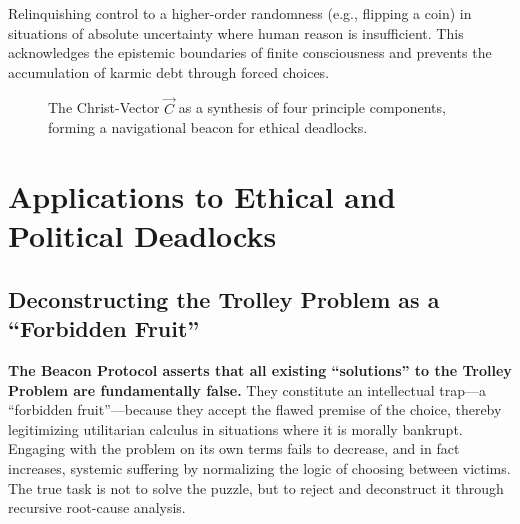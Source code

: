 \documentclass[11pt,a4paper]{article}
\begin{document}
\begin{small}
\begin{description}[style=nextline]
    \item[\textbf{Trust in Providence}] Relinquishing control to a higher-order randomness (e.g., flipping a coin) in situations of absolute uncertainty where human reason is insufficient. This acknowledges the epistemic boundaries of finite consciousness and prevents the accumulation of karmic debt through forced choices.
\end{description}

\begin{figure}[h!]
\centering
{}
\caption{The Christ-Vector $\vec{C}$ as a synthesis of four principle components, forming a navigational beacon for ethical deadlocks.}
\label{fig:christ_vector}
\end{figure}

\section{Applications to Ethical and Political Deadlocks}
\subsection{Deconstructing the Trolley Problem as a ``Forbidden Fruit''}
\textbf{The Beacon Protocol asserts that all existing ``solutions'' to the Trolley Problem are fundamentally false.} They constitute an intellectual trap—a ``forbidden fruit''—because they accept the flawed premise of the choice, thereby legitimizing utilitarian calculus in situations where it is morally bankrupt. Engaging with the problem on its own terms fails to decrease, and in fact increases, systemic suffering by normalizing the logic of choosing between victims. The true task is not to solve the puzzle, but to reject and deconstruct it through recursive root-cause analysis.


\end{small}
\end{document}
